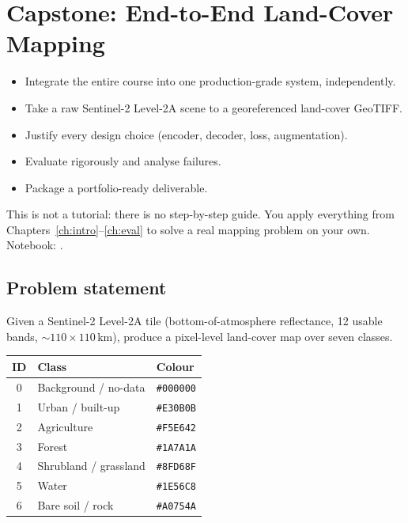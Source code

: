 \chapter{Capstone: End-to-End Land-Cover Mapping}
\label{ch:capstone}


\begin{objbox}
\begin{itemize}[leftmargin=1.2em,nosep]
  \item Integrate the entire course into one production-grade system, independently.
  \item Take a raw Sentinel-2 Level-2A scene to a georeferenced land-cover GeoTIFF.
  \item Justify every design choice (encoder, decoder, loss, augmentation).
  \item Evaluate rigorously and analyse failures.
  \item Package a portfolio-ready deliverable.
\end{itemize}
\end{objbox}

This is not a tutorial: there is no step-by-step guide. You apply everything from
Chapters~\ref{ch:intro}--\ref{ch:eval} to solve a real mapping problem on your
own. Notebook: .

\section{Problem statement}

Given a Sentinel-2 Level-2A tile (bottom-of-atmosphere reflectance, 12 usable
bands, $\sim$$110\times110$\,km), produce a pixel-level land-cover map over seven
classes.

\begin{center}\small
\renewcommand{\arraystretch}{1.15}
\begin{tabular}{@{}cll@{}}
\toprule
ID & Class & Colour\\
\midrule
0 & Background / no-data & \texttt{\#000000}\\
1 & Urban / built-up & \texttt{\#E30B0B}\\
2 & Agriculture & \texttt{\#F5E642}\\
3 & Forest & \texttt{\#1A7A1A}\\
4 & Shrubland / grassland & \texttt{\#8FD68F}\\
5 & Water & \texttt{\#1E56C8}\\
6 & Bare soil / rock & \texttt{\#A0754A}\\
\bottomrule
\end{tabular}
\end{center}

